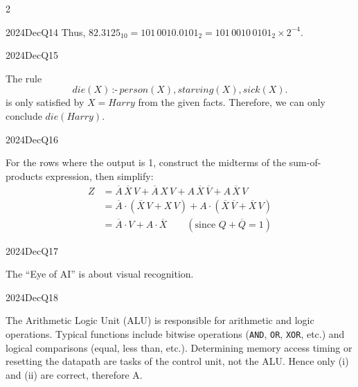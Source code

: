 \begin{multicols}{2}
\begin{qsolution}{2024}{Dec}{Q14}{\tgCE \tgCEFixedPointRepr}
    Thus, $82.3125_{10}=101\,0010.0101_2=101\,0010\,0101_2 \times 2^{-4}$.
\end{qsolution}

\begin{qsolution}{2024}{Dec}{Q15}{\tgCE \tgCELogicProgramming}

    The rule
    \begin{equation*}
        \textit{die}(X) \,\textit{:-}\, \textit{person}(X), \textit{starving}(X), \textit{sick}(X).
    \end{equation*}
    is only satisfied by $X=\textit{Harry}$ from the given facts.
    Therefore, we can only conclude $\textit{die}(\textit{Harry})$.
\end{qsolution}

\begin{qsolution}{2024}{Dec}{Q16}{\tgCE \tgCELogicalCircuits}

    For the rows where the output is 1, construct the midterms of the sum-of-products expression, then simplify:
    \begin{align*}
        Z &= \overline{A}\,\overline{X}\,V + \overline{A}\,X\,V + A\,\overline{X}\,\overline{V} + A\,\overline{X}\,V \\
        &= \overline{A}\cdot(\overline{X}\,V + X\,V) + A\cdot(\overline{X}\,\overline{V} + \overline{X}\,V) \\
        &= \overline{A}\cdot V + A\cdot \overline{X} \qquad (\text{since }Q+\overline{Q}=1)
    \end{align*}
\end{qsolution}

\begin{qsolution}{2024}{Dec}{Q17}{\tgCE \tgCEAI}

    The ``Eye of AI'' is about visual recognition.
\end{qsolution}

\begin{qsolution}{2024}{Dec}{Q18}{\tgCE \tgCEComputerOrganisation \tgAI}

    The Arithmetic Logic Unit (ALU) is responsible for arithmetic and logic operations.
    Typical functions include bitwise operations (\texttt{AND}, \texttt{OR}, \texttt{XOR}, etc.) and logical comparisons (equal, less than, etc.).
    Determining memory access timing or resetting the datapath are tasks of the control unit, not the ALU.
    Hence only (i) and (ii) are correct, therefore A.
\end{qsolution}


\end{multicols}
